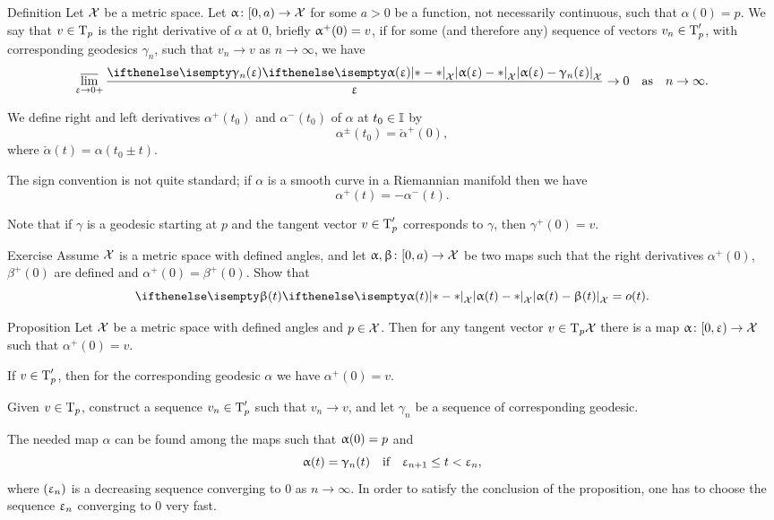 \begin{thm}{Definition}\label{def:right-derivative}
Let $\mathcal{X}$ be a metric space.
Let $\alpha\:[0,a)\to \spc{X}$ for some $a>0$ be a function, not necessarily continuous, such that $\alpha(0)=p$.
We say that $v\in\T_p$ is the right derivative of $\alpha$ at $0$,
briefly $\alpha^+(0)\z=v$, if for some (and therefore any) sequence of vectors $v_n\in\T'_p$,
with corresponding geodesics $\gamma_n$, 
such that $v_n\to v$ as $n\to\infty$, we have 
\[\limsup_{\eps\to0+}\frac{\dist{\alpha(\eps)}{\gamma_n(\eps)}{\spc{X}}}{\eps}\to 0\quad \text{as}\quad n\to\infty.\]

We define right and left derivatives $\alpha^+(t_0)$ and $\alpha^-(t_0)$
of $\alpha$ at $t_0\in\II$ by 
\[\alpha^\pm(t_0)=\check\alpha^+(0),\] where $\check\alpha(t)=\alpha(t_0\pm t)$.
\end{thm}

The sign convention is not quite standard; if $\alpha$ is a smooth curve in a Riemannian manifold then we have
\[\alpha^+(t)=-\alpha^-(t).\]

Note that if $\gamma$ is a geodesic starting at $p$ 
and the tangent vector $v\in\T_p'$ corresponds to $\gamma$, 
then $\gamma^+(0)=v$.

\begin{thm}{Exercise}\label{ex:tangent-vect=o(t)}
Assume $\mathcal{X}$ is a metric space with defined angles,
and let $\alpha,\beta\:[0,a)\to\spc{X}$ 
be two maps such that the right derivatives $\alpha^+(0)$, $\beta^+(0)$ are defined and $\alpha^+(0)=\beta^+(0)$.
Show that
\[\dist{\alpha(t)}{\beta(t)}{\spc{X}}=o(t).\]
\end{thm}

\begin{thm}{Proposition}
Let $\mathcal{X}$ be a metric space with defined angles and $p\in \spc{X}$.
Then for any tangent vector $v\in\T_p\spc{X}$ there is a map $\alpha\:[0,\eps)\to \spc{X}$ such that $\alpha^+(0)=v$.
\end{thm}

If $v\in \T_p'$, then for the corresponding geodesic $\alpha$ we have $\alpha^+(0)=v$.

Given $v\in \T_p$, construct a sequence $v_n\in\T'_p$ 
such that $v_n\to v$, and let $\gamma_n$ be a sequence of corresponding geodesic.

The needed map $\alpha$ can be found among the maps such that $\alpha(0)\z=p$ and
\[\alpha(t)=\gamma_n(t)\quad \text{if}\quad \eps_{n+1}\le t<\eps_n,\]
where $(\upvarepsilon_n)$
is a decreasing sequence converging to $0$ as $n\to\infty$.
In order to satisfy the conclusion of the proposition, one has to choose the sequence $\upvarepsilon_n$ converging to $0$ very fast.
\qeds

